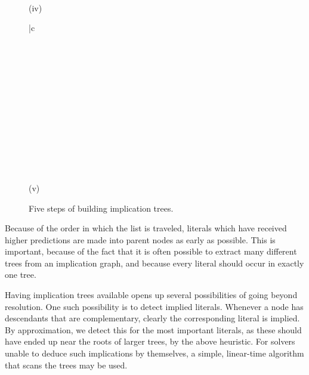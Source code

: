 \documentclass[twoside,11pt]{article}
\begin{document}
\begin{figure}[ht]
\begin{minipage}[b]{0.3\textwidth}
  \centering
  \vspace{-20pt}
  { }
    
  \\ \vspace{\baselineskip} (iv)
\end{minipage} \hfill
\begin{tabular}{|c}\vspace{-150pt}\\ \\ \\ \\ \\ \\ \\ \\ \\ \\ \\ \\ \end{tabular}
\begin{minipage}[b]{0.25\textwidth}
  \centering
  \vspace{-20pt}
    
  \\ \vspace{\baselineskip} (v)
\end{minipage} 

\caption{Five steps of building implication trees.}
\end{figure}

Because of the order in which the list is traveled, literals which have received higher predictions are
made into parent nodes as early as possible.  This is important, because of the fact that it is often 
possible to extract many different trees from an implication graph, and because every literal should 
occur in exactly one tree.

Having implication trees available opens up several possibilities of going beyond resolution. One such 
possibility is to detect implied literals. Whenever a node has descendants that are complementary, 
clearly the corresponding literal is implied. By approximation, we detect this for the most important 
literals, as these should have ended up near the roots of larger trees, by the above heuristic. For 
solvers unable to deduce such implications by themselves, a simple, linear-time algorithm that scans 
the trees may be used.
\end{document}
